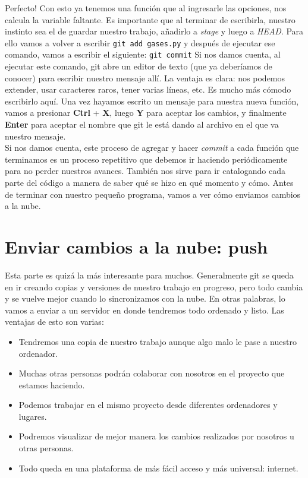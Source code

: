 \documentclass[10pt,letterpaper]{article}
\newcommand{\inlinecode}[1]{
\colorbox{light-gray}{\texttt{#1}}
}
\begin{document}
Perfecto! Con esto ya tenemos una funci\'on que al ingresarle las opciones, nos calcula la variable faltante. Es importante que al terminar de escribirla, nuestro instinto sea el de guardar nuestro trabajo, a\~nadirlo a \textit{stage} y luego a \textit{HEAD}. Para ello vamos a volver a escribir \inlinecode{git add gases.py} y despu\'es de ejecutar ese comando, vamos a escribir el siguiente: \inlinecode{git commit} Si nos damos cuenta, al ejecutar este comando, git abre un editor de texto (que ya deber\'iamos de conocer) para escribir nuestro mensaje all\'i. La ventaja es clara: nos podemos extender, usar caracteres raros, tener varias l\'ineas, etc. Es mucho m\'as c\'omodo escribirlo aqu\'i. Una vez hayamos escrito un mensaje para nuestra nueva funci\'on, vamos a presionar \textbf{Ctrl} + \textbf{X}, luego \textbf{Y} para aceptar los cambios, y finalmente \textbf{Enter} para aceptar el nombre que git le est\'a dando al archivo en el que va nuestro mensaje.\\

Si nos damos cuenta, este proceso de agregar y hacer \emph{commit} a cada funci\'on que terminamos es un proceso repetitivo que debemos ir haciendo peri\'odicamente para no perder nuestros avances. Tambi\'en nos sirve para ir catalogando cada parte del c\'odigo a manera de saber qu\'e se hizo en qu\'e momento y c\'omo. Antes de terminar con nuestro peque\~no programa, vamos a ver c\'omo enviamos cambios a la nube.

\section{Enviar cambios a la nube: push}
Esta parte es quiz\'a la m\'as interesante para muchos. Generalmente git se queda en ir creando copias y versiones de nuestro trabajo en progreso, pero todo cambia y se vuelve mejor cuando lo sincronizamos con la nube. En otras palabras, lo vamos a enviar a un servidor en donde tendremos todo ordenado y listo. Las ventajas de esto son varias:

\begin{itemize}
\item Tendremos una copia de nuestro trabajo aunque algo malo le pase a nuestro ordenador.
\item Muchas otras personas podr\'an colaborar con nosotros en el proyecto que estamos haciendo.
\item Podemos trabajar en el mismo proyecto desde diferentes ordenadores y lugares.
\item Podremos visualizar de mejor manera los cambios realizados por nosotros u otras personas.
\item Todo queda en una plataforma de m\'as f\'acil acceso y m\'as universal: internet.
\end{itemize}
\end{document}
